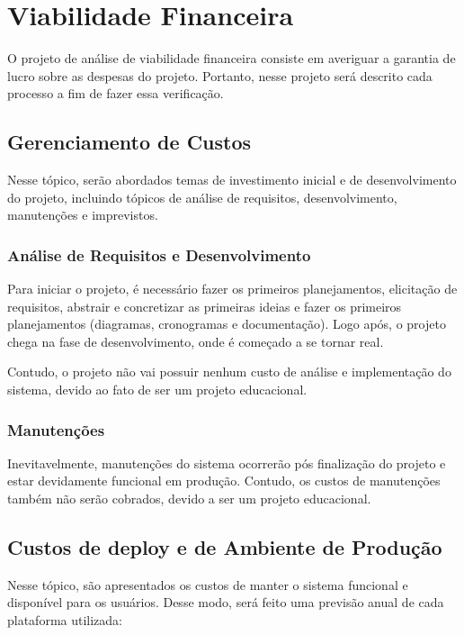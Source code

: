\section{Viabilidade Financeira}

O projeto de análise de viabilidade financeira consiste em averiguar a garantia de lucro sobre as despesas do projeto. Portanto, nesse projeto será descrito cada processo a fim de fazer essa verificação.

\subsection{Gerenciamento de Custos}

Nesse tópico, serão abordados temas de investimento inicial e de desenvolvimento do projeto, incluindo tópicos de análise de requisitos, desenvolvimento, manutenções e imprevistos.

\subsubsection{Análise de Requisitos e Desenvolvimento}

Para iniciar o projeto, é necessário fazer os primeiros planejamentos, elicitação de requisitos, abstrair e concretizar as primeiras ideias e fazer os primeiros planejamentos (diagramas, cronogramas e documentação). Logo após, o projeto chega na fase de desenvolvimento, onde é começado a se tornar real.

Contudo, o projeto não vai possuir nenhum custo de análise e implementação do sistema, devido ao fato de ser um projeto educacional.

\subsubsection{Manutenções}

Inevitavelmente, manutenções do sistema ocorrerão pós finalização do projeto e estar devidamente funcional em produção. Contudo, os custos de manutenções também não serão cobrados, devido a ser um projeto educacional.

\subsection{Custos de deploy e de Ambiente de Produção}

Nesse tópico, são apresentados os custos de manter o sistema funcional e disponível para os usuários. Desse modo, será feito uma previsão anual de cada plataforma utilizada:

